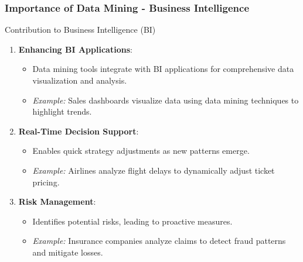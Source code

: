 \documentclass[aspectratio=169]{beamer}
\begin{document}
\begin{frame}[fragile]
    \frametitle{Importance of Data Mining - Business Intelligence}
    \begin{block}{Contribution to Business Intelligence (BI)}
        \begin{enumerate}
            \item \textbf{Enhancing BI Applications}:
                \begin{itemize}
                    \item Data mining tools integrate with BI applications for comprehensive data visualization and analysis.
                    \item \textit{Example:} Sales dashboards visualize data using data mining techniques to highlight trends.
                \end{itemize}
            \item \textbf{Real-Time Decision Support}:
                \begin{itemize}
                    \item Enables quick strategy adjustments as new patterns emerge.
                    \item \textit{Example:} Airlines analyze flight delays to dynamically adjust ticket pricing.
                \end{itemize}
            \item \textbf{Risk Management}:
                \begin{itemize}
                    \item Identifies potential risks, leading to proactive measures.
                    \item \textit{Example:} Insurance companies analyze claims to detect fraud patterns and mitigate losses.
                \end{itemize}
        \end{enumerate}
    \end{block}
\end{frame}
\end{document}
